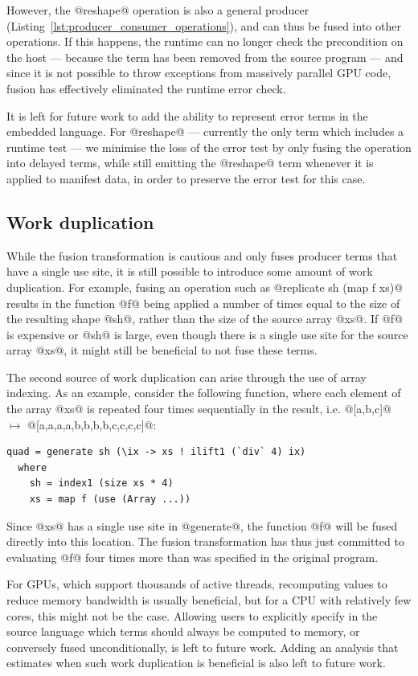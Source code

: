 However, the @reshape@ operation is also a general producer
(Listing~\ref{lst:producer_consumer_operations}), and can thus be fused into
other operations. If this happens, the runtime can no longer check the
precondition on the host --- because the term has been removed from the source
program --- and since it is not possible to throw exceptions from massively
parallel GPU code, fusion has effectively eliminated the runtime error check.

It is left for future work to add the ability to represent error terms in the
embedded language. For @reshape@ --- currently the only term which includes a
runtime test --- we minimise the loss of the error test by only fusing the
operation into delayed terms, while still emitting the @reshape@ term whenever
it is applied to manifest data, in order to preserve the error test for this
case.


\subsection{Work duplication}

While the fusion transformation is cautious and only fuses producer terms that
have a single use site, it is still possible to introduce some amount of work
duplication. For example, fusing an operation such as @replicate sh (map f xs)@
results in the function @f@ being applied a number of times equal to the size of
the resulting shape @sh@, rather than the size of the source array @xs@. If @f@
is expensive or @sh@ is large, even though there is a single use site for the
source array @xs@, it might still be beneficial to not fuse these terms.

The second source of work duplication can arise through the use of array
indexing. As an example, consider the following function, where each element of
the array @xs@ is repeated four times sequentially in the result, i.e.
@[a,b,c]@ $\mapsto$ @[a,a,a,a,b,b,b,b,c,c,c,c]@:
%
\begin{lstlisting}[style=haskell]
quad = generate sh (\ix -> xs ! ilift1 (`div` 4) ix)
  where
    sh = index1 (size xs * 4)
    xs = map f (use (Array ...))
\end{lstlisting}
%
Since @xs@ has a single use site in @generate@, the function @f@ will be fused
directly into this location. The fusion transformation has thus just committed
to evaluating @f@ four times more than was specified in the original program.

For GPUs, which support thousands of active threads, recomputing values to
reduce memory bandwidth is usually beneficial, but for a CPU with relatively few
cores, this might not be the case. Allowing users to explicitly specify in the
source language which terms should always be computed to memory, or conversely
fused unconditionally, is left to future work. Adding an analysis that estimates
when such work duplication is beneficial is also left to future work.


